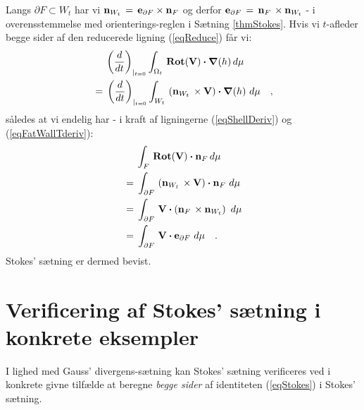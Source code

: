 \begin{bevis}
Langs $\partial F \subset W_{t}$ har vi
${\bf{n}}_{W_{t}}\, = \, {\bf{e}}_{\partial F}
\times {\bf{n}}_{F}$ og derfor
${\bf{e}}_{\partial F}\, = \, {\bf{n}}_{F}\,
\times {\bf{n}}_{W_{t}}$ - i overensstemmelse med
orienterings-reglen i Sætning \ref{thmStokes}.
Hvis vi $t$-afleder begge sider af den reducerede
ligning  (\ref{eqReduce}) får vi:
\begin{equation}
\begin{aligned}
&\phantom{=
\,\,\,}\left(\frac{d}{dt}\right)_{|_{t=0}}\int_{\Omega_{t}}\,
\operatorname{\mathbf{Rot}}({\bf{V}})\bm{\cdot}\bm{\nabla}(h)\, d\mu \, \\ &= \,
\left(\frac{d}{dt}\right)_{|_{t=0}}\int_{W_{t}}\,
\left({\bf{n}}_{W_{t}}\, \times {\bf{V}}\right)
\bm{\cdot} \bm{\nabla}(h)
 \, \,d\mu
\quad ,
\end{aligned}
\end{equation}
således at vi endelig har - i kraft af
ligningerne (\ref{eqShellDeriv}) og
(\ref{eqFatWallTderiv}):
\begin{equation}
\begin{aligned}
&\phantom{= \,\,\,}\int_{F}\, \operatorname{\mathbf{Rot}}({\bf{V}})\bm{\cdot}
{\bf{n}}_{F} \, d\mu \,
\\ &= \,\int_{\partial F}\,
\left({\bf{n}}_{W_{t}}\, \times {\bf{V}}\right)
\bm{\cdot} {\bf{n}}_{F}
 \, \,d\mu \\ &= \,
\int_{\partial F}\,
{\bf{V}}\bm{\cdot}\left({\bf{n}}_{F}\, \times
{\bf{n}}_{W_{t}} \right)
 \, \,d\mu \\ &= \,
\int_{\partial F}\, {\bf{V}} \bm{\cdot}
{\bf{e}}_{\partial F}
 \, \,d\mu
\quad .
\end{aligned}
\end{equation}
Stokes' sætning er dermed bevist.
\end{bevis}



\section{Verificering af Stokes' sætning i konkrete eksempler} \label{secVerif}


I lighed med Gauss' divergens-sætning kan Stokes'
sætning verificeres ved i konkrete givne tilfælde
at beregne \emph{begge sider} af identiteten
(\ref{eqStokes}) i Stokes' sætning.



